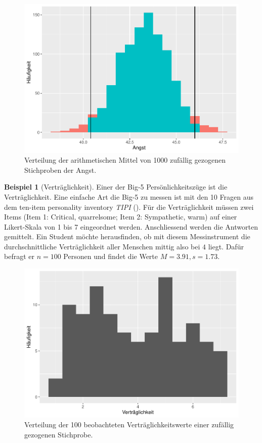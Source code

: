 \documentclass[
]{book}
\theoremstyle{definition}
\theoremstyle{definition}
\newtheorem{example}{Beispiel}[chapter]
\theoremstyle{definition}
\theoremstyle{definition}
\theoremstyle{remark}
\begin{document}
\begin{figure}
\centering
\includegraphics{aps_statistik1_files/figure-latex/exm-angst-hist-means-emp-ci-1.pdf}
\caption{\label{fig:exm-angst-hist-means-emp-ci}Verteilung der arithmetischen Mittel von 1000 zufällig gezogenen Stichproben der Angst.}
\end{figure}

\begin{example}[Verträglichkeit]
\protect\hypertarget{exm:agreableness}{}\label{exm:agreableness}Einer der Big-5 Persönlichkeitszüge ist die Verträglichkeit. Eine einfache Art die Big-5 zu messen ist mit den 10 Fragen aus dem ten-item personality inventory \emph{TIPI} (). Für die Verträglichkeit müssen zwei Items (Item 1: Critical, quarrelsome; Item 2: Sympathetic, warm) auf einer Likert-Skala von 1 bis 7 eingeordnet werden. Anschliessend werden die Antworten gemittelt. Ein Student möchte herausfinden, ob mit diesem Messinstrument die durchschnittliche Verträglichkeit aller Menschen mittig also bei \(4\) liegt. Dafür befragt er \(n = 100\) Personen und findet die Werte \(M=3.91, s = 1.73\).
\end{example}

\begin{figure}
\centering
\includegraphics{aps_statistik1_files/figure-latex/exm-agreableness-hist-1.pdf}
\caption{\label{fig:exm-agreableness-hist}Verteilung der 100 beobachteten Verträglichkeitswerte einer zufällig gezogenen Stichprobe.}
\end{figure}
\end{document}
